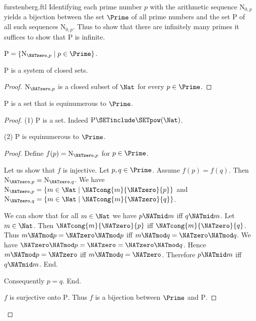 \documentclass{stex}
\newcommand{\N}{\mathrm{N}}
\newcommand{\Ps}{\mathrm{P}}
\begin{document}
\begin{smodule}{furstenberg.ftl}
Identifying each prime number $p$ with the arithmetic sequence $\N_{0, p}$
yields a bijection between the set $\Prime$ of all prime numbers and the set
$\Ps$ of all such sequences $\N_{0, p}$.
Thus to show that there are infinitely many primes it suffices to show that
$\Ps$ is infinite.

\begin{forthel}
  \begin{definition}
    $\Ps = \{ \N_{\NATzero, p} \mid p \in \Prime \}$.
  \end{definition}

  \begin{lemma}
    $\Ps$ is a system of closed sets.
  \end{lemma}
  \begin{proof}
    $\N_{\NATzero, p}$ is a closed subset of $\Nat$ for every $p \in \Prime$.
  \end{proof}

  \begin{lemma}
    $\Ps$ is a set that is equinumerous to $\Prime$.
  \end{lemma}
  \begin{proof}
    (1) $\Ps$ is a set.
    Indeed $\Ps \SETinclude \SETpow(\Nat)$.

    (2) $\Ps$ is equinumerous to $\Prime$.
    \begin{proof}
      Define $f(p) = \N_{\NATzero,p}$ for $p \in \Prime$.

      Let us show that $f$ is injective.
        Let $p, q \in \Prime$.
        Assume $f(p) = f(q)$.
        Then $\N_{\NATzero, p} = \N_{\NATzero, q}$.
        We have $\N_{\NATzero, p} = \{ m \in \Nat \mid \NATcong{m}{\NATzero}{p} \}$ and
        $\N_{\NATzero, q} = \{ m \in \Nat \mid \NATcong{m}{\NATzero}{q} \}$.

        We can show that for all $m \in \Nat$ we have $p \NATmid m$ iff $q \NATmid m$.
          Let $m \in \Nat$.
          Then $\NATcong{m}{\NATzero}{p}$ iff $\NATcong{m}{\NATzero}{q}$.
          Thus $m \NATmod p = \NATzero \NATmod p$ iff $m \NATmod q = \NATzero \NATmod q$.
          We have $\NATzero \NATmod p = \NATzero = \NATzero \NATmod q$.
          Hence $m \NATmod p = \NATzero$ iff $m \NATmod q = \NATzero$.
          Therefore $p \NATmid m$ iff $q \NATmid m$.
        End.

        Consequently $p = q$.
      End.

      $f$ is surjective onto $\Ps$.
      Thus $f$ is a bijection between $\Prime$ and $\Ps$.
    \end{proof}
  \end{proof}


\end{forthel}
\end{smodule}
\end{document}
